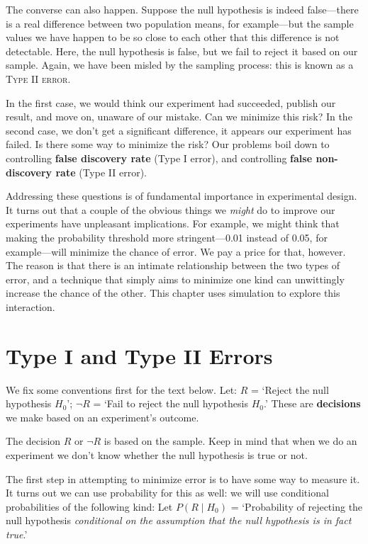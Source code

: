 \documentclass[12pt]{book}\usepackage[]{graphicx}\usepackage[]{color}
\begin{document}
The converse can also happen. Suppose the null hypothesis is indeed
false---there is a real difference between two population means, for
example---but the sample values we have happen to be so close to each other that this difference is not detectable. Here, the null hypothesis is false, but we fail to reject it based on our sample. Again, we have
been misled by the sampling process: this is known as a \textsc{Type II error}.

In the first case, we would think our experiment had succeeded, publish our result, and move on, unaware of our mistake. Can we minimize this risk? In the second case, we don't get a significant difference, it appears our experiment has failed. Is there some way to minimize the risk? Our problems boil down to controlling \textbf{false discovery rate} (Type I error), and controlling \textbf{false non-discovery rate} (Type II error).

Addressing these questions is of fundamental importance in experimental design. It turns out that a couple of the obvious things we \emph{might} do to improve our experiments have unpleasant implications. For example, we might think that making the probability threshold more stringent---0.01 instead of 0.05, for example---will minimize the chance of error. We pay a price for that, however. The reason is that there is an intimate relationship between the two types of error, and a technique that simply aims to minimize one kind can unwittingly increase the chance of the other. This chapter uses simulation to explore this interaction.

\section{Type I and Type II Errors}


We fix some conventions first for the text below. Let: $R$ = `Reject the null hypothesis $H_0$'; 
$\neg R$ = `Fail to reject the null hypothesis $H_0$.' These are \textbf{decisions} we make based on an experiment's outcome.

The decision $R$ or $\neg R$ is based on the sample.
Keep in mind that when we do an experiment we don't know whether the null
hypothesis is true or not.

The first step in attempting to minimize error is to have some way to measure it. It turns out we can use probability for this as well: we will use conditional probabilities of the following kind:
Let $P(R\mid H_0)$ = `Probability of rejecting the null
hypothesis \textit{conditional on the assumption that the null hypothesis is in fact true}.'
\end{document}
